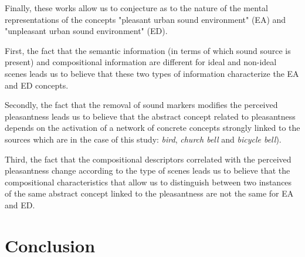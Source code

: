 \documentclass[twoside,twocolumn]{article}
\begin{document}

Finally, these works allow us to conjecture as to the nature of the mental representations of the concepts "pleasant urban sound environment" (EA) and "unpleasant urban sound environment" (ED).


First, the fact that the semantic information (in terms of which sound source is present) and compositional information are different for ideal and non-ideal scenes leads us to believe that these two types of information characterize the EA and ED concepts.


Secondly, the fact that the removal of sound markers modifies the perceived pleasantness leads us to believe that the abstract concept related to pleasantness depends on the activation of a network of concrete concepts strongly linked to the sources which are in the case of this study: \emph{bird}, \emph{church bell} and \emph{bicycle bell}).


Third, the fact that the compositional descriptors correlated with the perceived pleasantness change according to the type of scenes leads us to believe that the compositional characteristics that allow us to distinguish between two instances of the same abstract concept linked to the pleasantness are not the same for EA and ED.

\section{Conclusion}
\end{document}
